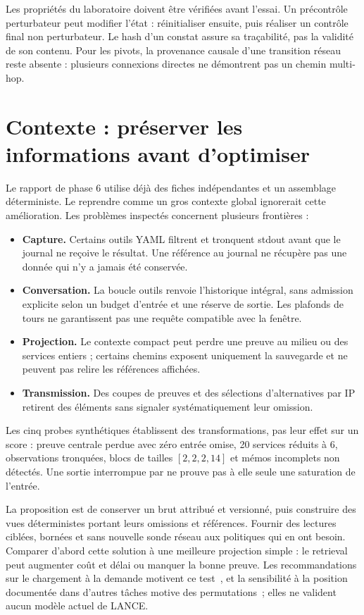 \documentclass[11pt,a4paper]{article}
\newcommand{\code}[1]{{\small\ttfamily\path{#1}}}
\begin{document}
Les propriétés du laboratoire doivent être vérifiées avant l'essai. Un
précontrôle perturbateur peut modifier l'état : réinitialiser ensuite, puis
réaliser un contrôle final non perturbateur. Le hash d'un constat assure sa
traçabilité, pas la validité de son contenu. Pour les pivots, la provenance
causale d'une transition réseau reste absente : plusieurs connexions directes
ne démontrent pas un chemin multi-hop.

\section{Contexte : préserver les informations avant d'optimiser}
Le rapport de phase 6 utilise déjà des fiches indépendantes et un assemblage
déterministe. Le reprendre comme un gros contexte global ignorerait cette
amélioration. Les problèmes inspectés concernent plusieurs frontières :
\begin{itemize}
\item \textbf{Capture.} Certains outils YAML filtrent et tronquent stdout avant
que le journal ne reçoive le résultat. Une référence au journal ne récupère pas
une donnée qui n'y a jamais été conservée.
\item \textbf{Conversation.} La boucle outils renvoie l'historique intégral,
sans admission explicite selon un budget d'entrée et une réserve de sortie.
Les plafonds de tours ne garantissent pas une requête compatible avec la fenêtre.
\item \textbf{Projection.} Le contexte compact peut perdre une preuve au milieu
ou des services entiers ; certains chemins exposent uniquement la sauvegarde et
ne peuvent pas relire les références affichées.
\item \textbf{Transmission.} Des coupes de preuves et des sélections d'alternatives
par IP retirent des éléments sans signaler systématiquement leur omission.
\end{itemize}

Les cinq probes synthétiques établissent des transformations, pas leur effet
sur un score : preuve centrale perdue avec zéro entrée omise, 20 services réduits
à 6, observations tronquées, blocs de tailles $[2,2,2,14]$ et mémos incomplets
non détectés. Une sortie interrompue par \code{finish_reason=length} ne prouve
pas à elle seule une saturation de l'entrée.

La proposition est de conserver un brut attribué et versionné, puis construire
des vues déterministes portant leurs omissions et références. Fournir des
lectures ciblées, bornées et sans nouvelle sonde réseau aux politiques qui en
ont besoin. Comparer d'abord cette solution à une meilleure projection
simple : le retrieval peut augmenter coût et délai ou manquer la bonne preuve.
Les recommandations sur le chargement à la demande motivent ce test~\cite{context},
et la sensibilité à la position documentée dans d'autres tâches motive des
permutations~\cite{lost}; elles ne valident aucun modèle actuel de LANCE.
\end{document}
